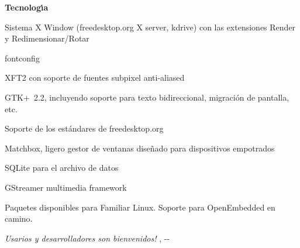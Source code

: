 {\smallskip
\textbf{Tecnolog{\'\i}a}
\begin{compactitem}
   \item Sistema X Window {\texttrademark}{} (freedesktop.org X
     server, kdrive) con las extensiones Render y
     Redimensionar/Rotar
   \item fontconfig
   \item XFT2 con soporte de fuentes subpixel anti-aliased
   \item GTK+~2.2, incluyendo soporte para texto bidireccional, migraci{\'o}n de pantalla,
     etc.
   \item Soporte de los est{\'a}ndares de freedesktop.org
   \item Matchbox, ligero gestor de ventanas dise{\~n}ado para dispositivos
     empotrados
   \item SQLite para el archivo de datos
   \item GStreamer multimedia framework
   \item Paquetes disponibles para Familiar Linux. Soporte para OpenEmbedded
     en camino.
\end{compactitem}

\smallskip
\textit{{\textexclamdown}Usarios y desarrolladores son bienvenidos!}%
\hfill\tiny{\rcsInfoRevision, \rcsInfoYear-\rcsInfoMonth-\rcsInfoDay}
}

